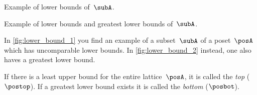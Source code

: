\begin{solution}
    \begin{marginfigure}
        \centering
        \caption{Example of lower bounds of~$\subA$. \label{fig:lower_bound_1}}
    \end{marginfigure}
    \begin{marginfigure}
        \centering
        \caption{Example of lower bounds and greatest lower bounds of~$\subA$. \label{fig:lower_bound_2}}
    \end{marginfigure}

    In \cref{fig:lower_bound_1} you find an example of a subset~$\subA$ of a poset~$\posA$ which has uncomparable lower bounds.
    In \cref{fig:lower_bound_2} instead, one also haves a greatest lower bound.
\end{solution}

\begin{definition}
    \label{def:top}
    \label{def:bot}
    If there is a least upper bound for the entire lattice~$\posA$, it is called the \emph{top} ($\postop$).
    If a greatest lower bound exists it is called the \emph{bottom} ($\posbot$).
\end{definition}
